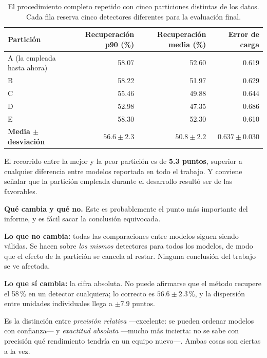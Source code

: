 \documentclass[11pt,a4paper]{article}
\begin{document}
\begin{table}[H]
\centering
\caption{El procedimiento completo repetido con cinco particiones distintas de los datos.
Cada fila reserva cinco detectores diferentes para la evaluación final.}
\label{tab:cv}
\begin{tabular}{lrrr}
\toprule
\textbf{Partición} & \textbf{Recuperación p90} (\%) & \textbf{Recuperación media} (\%) &
\textbf{Error de carga} \\
\midrule
A (la empleada hasta ahora) & 58.07 & 52.60 & 0.619 \\
B & 58.22 & 51.97 & 0.629 \\
C & 55.46 & 49.88 & 0.644 \\
D & 52.98 & 47.35 & 0.686 \\
E & 58.30 & 52.30 & 0.610 \\
\midrule
\textbf{Media $\pm$ desviación} & $\mathbf{56.6 \pm 2.3}$ & $\mathbf{50.8 \pm 2.2}$ &
$0.637 \pm 0.030$ \\
\bottomrule
\end{tabular}
\end{table}

El recorrido entre la mejor y la peor partición es de \textbf{5.3 puntos}, superior a
cualquier diferencia entre modelos reportada en todo el trabajo. Y conviene señalar que la
partición empleada durante el desarrollo resultó ser de las favorables.

\begin{idea}
\noindent\textbf{Qué cambia y qué no.} Este es probablemente el punto más importante del
informe, y es fácil sacar la conclusión equivocada.

\smallskip
\noindent\textbf{Lo que no cambia:} todas las comparaciones entre modelos siguen siendo
válidas. Se hacen sobre \emph{los mismos} detectores para todos los modelos, de modo que el
efecto de la partición se cancela al restar. Ninguna conclusión del trabajo se ve afectada.

\smallskip
\noindent\textbf{Lo que sí cambia:} la cifra absoluta. No puede afirmarse que el método
recupere el 58\,\% en un detector cualquiera; lo correcto es $\mathbf{56.6 \pm 2.3\,\%}$, y
la dispersión entre unidades individuales llega a $\pm 7.9$ puntos.

\smallskip
\noindent Es la distinción entre \emph{precisión relativa} ---excelente: se pueden ordenar
modelos con confianza--- y \emph{exactitud absoluta} ---mucho más incierta: no se sabe con
precisión qué rendimiento tendría en un equipo nuevo---. Ambas cosas son ciertas a la vez.
\end{idea}
\end{document}
